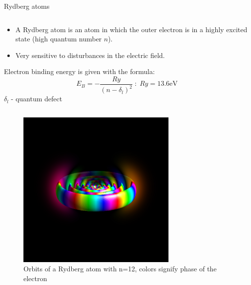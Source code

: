 \begin{columnframe}{Rydberg atoms}
    \begin{column}{0.5\textwidth}
        \begin{itemize}
            \item A Rydberg atom is an atom in which the outer electron is in a highly excited state (high quantum number $n$).
            \item Very sensitive to disturbances in the electric field.
        \end{itemize}
        Electron binding energy is given with the formula:
        \[
            E_B = -\dfrac{Ry}{(n - \delta_l)^2} \; : \; Ry = 13.6 \si{\electronvolt}
        \]
        $\delta_l$ - quantum defect
    \end{column}
    \begin{column}{0.5\textwidth}
        \begin{figure}
            \centering
            \includegraphics[width=0.7\textwidth, frame]{images/rydberg_atom_colorful.jpg}
            \caption{Orbits of a Rydberg atom with n=12, colors signify phase of the electron}
        \end{figure}
    \end{column}
\end{columnframe}

